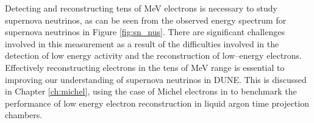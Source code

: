 Detecting and reconstructing tens of MeV electrons is necessary to study 
supernova neutrinos, as can be seen from the observed energy spectrum for 
supernova neutrinos in Figure \ref{fig:sn_nus}. There are significant 
challenges involved in this measurement as a result of the difficulties involved
in the detection of low energy activity and the reconstruction of low--energy 
electrons. Effectively reconstructing electrons in the tens of MeV range is 
essential to improving our understanding of supernova neutrinos in DUNE. This 
is discussed in Chapter \ref{ch:michel}, using the case of Michel electrons in 
\protodune{} to benchmark the performance of low energy electron reconstruction 
in liquid argon time projection chambers.
